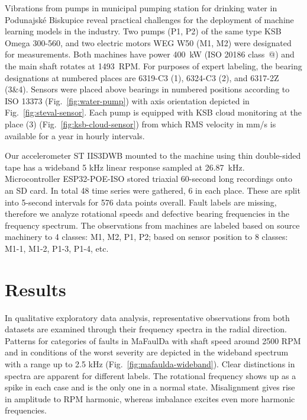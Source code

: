 \documentclass{llncs}
\makeatletter
\newcommand*{\rom}[1]{\expandafter\@slowromancap\romannumeral #1@}
\makeatother
\begin{document}
Vibrations from pumps in municipal pumping station for drinking water in Podunajské Biskupice reveal practical challenges for the deployment of machine learning models in the industry. Two pumps (P1, P2) of the same type KSB Omega 300-560, and two electric motors WEG W50 (M1, M2) were designated for measurements. Both machines have power 400~kW (ISO 20186 class~\rom{3}) and the main shaft rotates at 1493~RPM. For purposes of expert labeling, the bearing designations at numbered places are 6319-C3 (1), 6324-C3 (2), and 6317-2Z (3\&4). Sensors were placed above bearings in numbered positions according to ISO 13373 (Fig.~\ref{fig:water-pump}) with axis orientation depicted in Fig.~\ref{fig:steval-sensor}. Each pump is equipped with KSB cloud monitoring at the place (3) (Fig.~\ref{fig:ksb-cloud-sensor}) from which RMS velocity in mm/s is available for a year in hourly intervals. 

Our accelerometer ST IIS3DWB mounted to the machine using thin double-sided tape has a wideband 5 kHz linear response sampled at 26.87~kHz. Microcontroller ESP32-POE-ISO stored triaxial 60-second long recordings onto an SD card. In total 48 time series were gathered, 6 in each place. These are split into 5-second intervals for 576 data points overall. Fault labels are missing, therefore we analyze rotational speeds and defective bearing frequencies in the frequency spectrum. The observations from machines are labeled based on source machinery to 4 classes: M1, M2, P1, P2; based on sensor position to 8 classes: M1-1, M1-2, P1-3, P1-4, etc.

\section{Results}
In qualitative exploratory data analysis, representative observations from both datasets are examined through their frequency spectra in the radial direction. Patterns for categories of faults in MaFaulDa with shaft speed around 2500 RPM and in conditions of the worst severity are depicted in the wideband spectrum with a range up to 2.5 kHz (Fig.~\ref{fig:mafaulda-wideband}). Clear distinctions in spectra are apparent for different labels. The rotational frequency shows up as a spike in each case and is the only one in a normal state. Misalignment gives rise in amplitude to  RPM harmonic, whereas imbalance excites even more harmonic frequencies.
\end{document}
